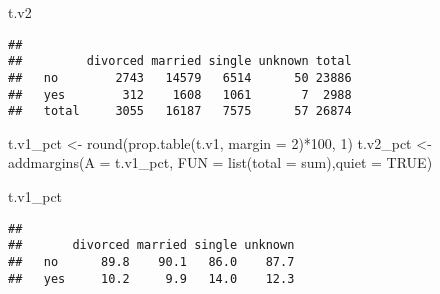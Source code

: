 \documentclass[
]{article}
\newenvironment{Shaded}{\begin{snugshade}}{\end{snugshade}}
\newcommand{\AttributeTok}[1]{\textcolor[rgb]{0.77,0.63,0.00}{#1}}
\newcommand{\CommentTok}[1]{\textcolor[rgb]{0.56,0.35,0.01}{\textit{#1}}}
\newcommand{\ConstantTok}[1]{\textcolor[rgb]{0.00,0.00,0.00}{#1}}
\newcommand{\DecValTok}[1]{\textcolor[rgb]{0.00,0.00,0.81}{#1}}
\newcommand{\FunctionTok}[1]{\textcolor[rgb]{0.00,0.00,0.00}{#1}}
\newcommand{\NormalTok}[1]{#1}
\newcommand{\OtherTok}[1]{\textcolor[rgb]{0.56,0.35,0.01}{#1}}
\newcommand{\SpecialCharTok}[1]{\textcolor[rgb]{0.00,0.00,0.00}{#1}}
\begin{document}
\begin{Shaded}
\begin{Highlighting}[]
\NormalTok{t.v2}
\end{Highlighting}
\end{Shaded}

\begin{verbatim}
##        
##         divorced married single unknown total
##   no        2743   14579   6514      50 23886
##   yes        312    1608   1061       7  2988
##   total     3055   16187   7575      57 26874
\end{verbatim}

\begin{Shaded}
\begin{Highlighting}[]
\NormalTok{t.v1\_pct }\OtherTok{\textless{}{-}} \FunctionTok{round}\NormalTok{(}\FunctionTok{prop.table}\NormalTok{(t.v1, }\AttributeTok{margin =} \DecValTok{2}\NormalTok{)}\SpecialCharTok{*}\DecValTok{100}\NormalTok{, }\DecValTok{1}\NormalTok{)}
\NormalTok{t.v2\_pct }\OtherTok{\textless{}{-}} \FunctionTok{addmargins}\NormalTok{(}\AttributeTok{A =}\NormalTok{ t.v1\_pct, }\AttributeTok{FUN =} \FunctionTok{list}\NormalTok{(}\AttributeTok{total =}\NormalTok{ sum),}\AttributeTok{quiet =} \ConstantTok{TRUE}\NormalTok{)}

\NormalTok{t.v1\_pct}
\end{Highlighting}
\end{Shaded}

\begin{verbatim}
##      
##       divorced married single unknown
##   no      89.8    90.1   86.0    87.7
##   yes     10.2     9.9   14.0    12.3
\end{verbatim}

\begin{Shaded}
\end{Shaded}
\end{document}
